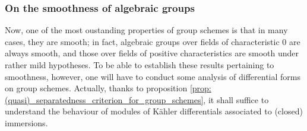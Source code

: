         \subsubsection{On the smoothness of algebraic groups}
            Now, one of the most oustanding properties of group schemes is that in many cases, they are smooth; in fact, algebraic groups over fields of characteristic $0$ are always smooth, and those over fields of positive characteristics are smooth under rather mild hypotheses. To be able to establish these results pertaining to smoothness, however, one will have to conduct some analysis of differential forms on group schemes. Actually, thanks to proposition \ref{prop: (quasi)_separatedness_criterion_for_group_schemes}, it shall suffice to understand the behaviour of modules of K\"ahler differentials associated to (closed) immersions.
            
